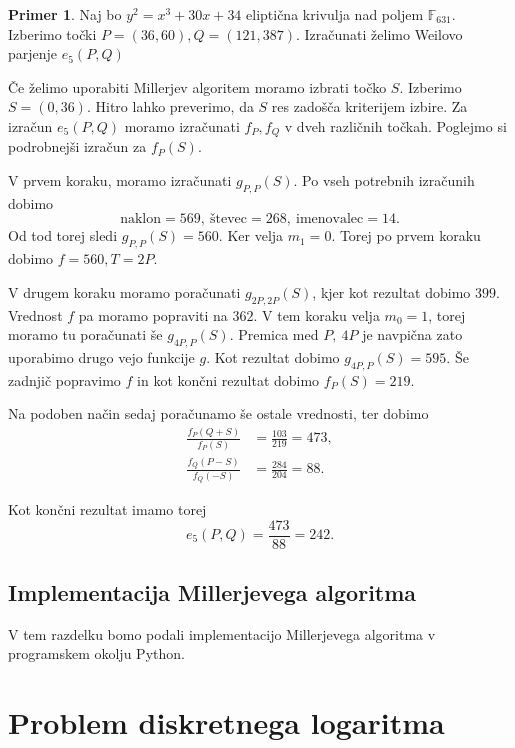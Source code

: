 \documentclass[12pt,a4paper,twoside]{article}
\theoremstyle{definition} %
\newtheorem{primer}[definicija]{Primer}
\theoremstyle{plain} %
\numberwithin{equation}{section}  %
\newcommand{\F}{\mathbb F}
\begin{document}
\begin{primer}
Naj bo $y^2 = x^3+30x+34$ eliptična krivulja nad poljem $\F_{631}$. Izberimo točki $P = (36,60),Q = (121,387)$. Izračunati želimo Weilovo parjenje $e_5(P,Q)$

Če želimo uporabiti Millerjev algoritem moramo izbrati točko $S$. Izberimo $S=(0,36)$. Hitro lahko preverimo, da $S$ res zadošča kriterijem izbire.
Za izračun $e_5(P,Q)$ moramo izračunati $f_P,f_Q$ v dveh različnih točkah. Poglejmo si podrobnejši izračun za $f_P(S)$.

V prvem koraku, moramo izračunati $g_{P,P}(S)$. Po vseh potrebnih izračunih dobimo $$\text{naklon} = 569,\ \text{števec} = 268,\ \text{imenovalec} = 14.$$ Od tod torej sledi $g_{P,P}(S) = 560$. Ker velja $m_1 = 0$. Torej po prvem koraku dobimo $f = 560, T = 2P$.

V drugem koraku moramo poračunati $g_{2P,2P}(S)$, kjer kot rezultat dobimo $399$. Vrednost $f$ pa moramo popraviti na $362$. V tem koraku velja $m_0 = 1$, torej moramo tu poračunati še
$g_{4P,P}(S)$. Premica med $P,\ 4P$ je navpična zato uporabimo drugo vejo funkcije $g$. Kot rezultat dobimo $g_{4P,P}(S) = 595$. Še zadnjič popravimo $f$ in kot končni rezultat dobimo
$f_P(S) = 219$.

Na podoben način sedaj poračunamo še ostale vrednosti, ter dobimo
\begin{align}
\frac{f_P(Q+S)}{f_P(S)} &{}= \frac{103}{219} = 473, \nonumber \\
\frac{f_Q(P-S)}{f_Q(-S)} &{}= \frac{284}{204} = 88. \nonumber
\end{align}

Kot končni rezultat imamo torej
$$e_5(P,Q) =\frac{473}{88} = 242.$$

\end{primer}

\subsection{Implementacija Millerjevega algoritma}
V tem razdelku bomo podali implementacijo Millerjevega algoritma v programskem okolju Python.



\newpage

\section{Problem diskretnega logaritma}
\end{document}
